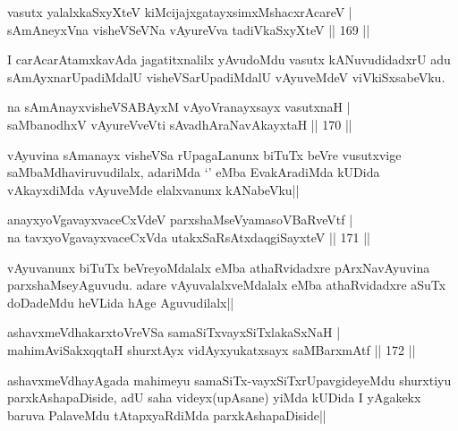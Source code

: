 \begin{shl}
vasutx yalalxkaSxyXteV kiMcijajxgatayxsimxMshacxrAcareV |\\
sAmAneyxVna visheVSeVNa vAyureVva tadiVkaSxyXteV \hfill || 169 ||
\end{shl}

\begin{artha}
I carAcarAtamxkavAda jagatitxnalilx yAvudoMdu vasutx kANuvudidadxrU adu sAmAyxnarUpadiMdalU visheVSarUpadiMdalU vAyuveMdeV viVkiSxsabeVku.
\end{artha}

\begin{shl}
na sAmAnayxvisheVSABAyxM vAyoVranayxsayx vasutxnaH |\\
saMbanodhxV vAyureVveVti sAvadhAraNavAkayxtaH \hfill || 170 ||
\end{shl}

\begin{artha}
vAyuvina sAmanayx visheVSa rUpagaLanunx biTuTx beVre vusutxvige saMbaMdhaviruvudilalx, adariMda `\stext' eMba EvakAradiMda kUDida vAkayxdiMda vAyuveMde elalxvanunx kANabeVku||
\end{artha}


\begin{shl}
anayxyoVgavayxvaceCxVdeV parxshaMseVyamasoVBaRveVtf |\\
na tavxyoVgavayxvaceCxVda utakxSaRsAtxdaqgiSayxteV \hfill || 171 ||
\end{shl}

\begin{artha}
vAyuvanunx biTuTx beVreyoMdalalx eMba athaRvidadxre pArxNavAyuvina parxshaMseyAguvudu. adare vAyuvalalxveMdalalx eMba athaRvidadxre aSuTx doDadeMdu heVLida hAge Aguvudilalx||
\end{artha}


\begin{shl}
ashavxmeVdhakarxtoVreVSa samaSiTxvayxSiTxlakaSxNaH |\\
mahimA\s \s viSakxqqtaH shurxtAyx vidAyxyukatxsayx saMBarxmAtf \hfill || 172 ||
\end{shl}

\begin{artha}
ashavxmeVdhayAgada mahimeyu samaSiTx-vayxSiTxrUpavgideyeMdu shurxtiyu parxkAshapaDiside, adU saha videyx(upAsane) yiMda kUDida I yAgakekx baruva PalaveMdu tAtapxyaRdiMda parxkAshapaDiside||
\end{artha}


